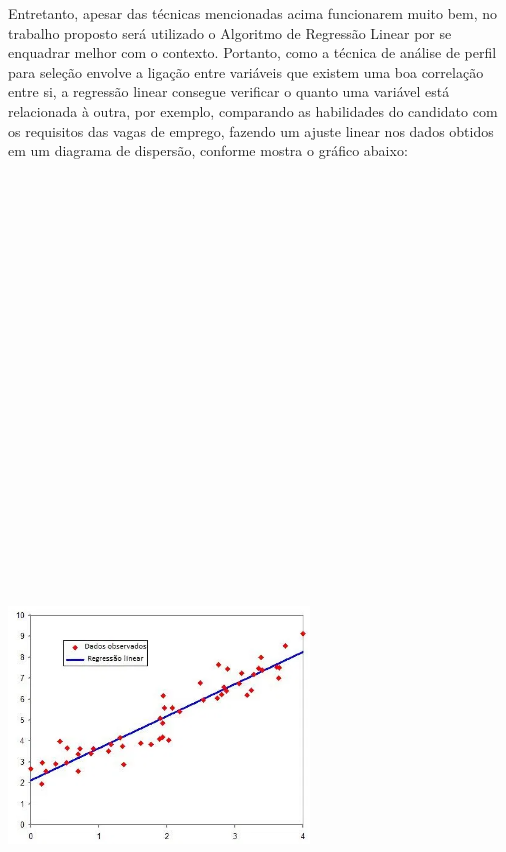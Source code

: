 \documentclass[conference]{IEEEtran}
\begin{document}
Entretanto, apesar das técnicas mencionadas acima funcionarem muito bem, no trabalho proposto será utilizado o Algoritmo de Regressão Linear por se enquadrar melhor com o contexto. Portanto, como a técnica de análise de perfil para seleção envolve a ligação entre variáveis que existem uma boa correlação entre si, a regressão linear consegue verificar o quanto uma variável está relacionada à outra, por exemplo, comparando as habilidades do candidato com os requisitos das vagas de emprego, fazendo um ajuste linear nos dados obtidos em um diagrama de dispersão, conforme mostra o gráfico abaixo:

\vspace{7mm}
\centerline{\includegraphics[width=80mm,height=600mm,keepaspectratio]{ExRegressaoLinear.png}}
\end{document}
